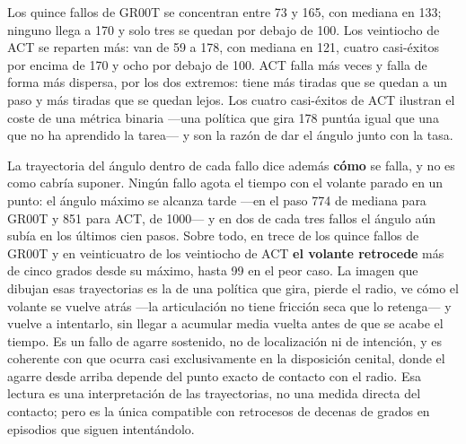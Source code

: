 \begin{table}[ht]
	\centering
	\caption{Caracterización de los episodios fallidos}
	\label{tab:fallos}
\end{table}

Los quince fallos de GR00T se concentran entre 73\textdegree{} y 165\textdegree, con mediana en
133\textdegree; ninguno llega a 170\textdegree{} y solo tres se quedan por debajo de
100\textdegree. Los veintiocho de ACT se reparten más: van de 59\textdegree{} a 178\textdegree,
con mediana en 121\textdegree, cuatro casi-éxitos por encima de 170\textdegree{} y ocho por debajo
de 100\textdegree. ACT falla más veces y falla de forma más dispersa, por los dos extremos: tiene
más tiradas que se quedan a un paso y más tiradas que se quedan lejos. Los cuatro casi-éxitos de
ACT ilustran el coste de una métrica binaria —una política que gira 178\textdegree{} puntúa igual
que una que no ha aprendido la tarea— y son la razón de dar el ángulo junto con la tasa.

La trayectoria del ángulo dentro de cada fallo dice además \textbf{cómo} se falla, y no es como
cabría suponer. Ningún fallo agota el tiempo con el volante parado en un punto: el ángulo máximo se
alcanza tarde —en el paso 774 de mediana para GR00T y 851 para ACT, de 1000— y en dos de cada
tres fallos el ángulo aún subía en los últimos cien pasos. Sobre todo, en trece de los quince
fallos de GR00T y en veinticuatro de los veintiocho de ACT \textbf{el volante retrocede} más de
cinco grados desde su máximo, hasta 99\textdegree{} en el peor caso. La imagen que dibujan esas
trayectorias es la de una política que gira, pierde el radio, ve cómo el volante se vuelve atrás
—la articulación no tiene fricción seca que lo retenga— y vuelve a intentarlo, sin llegar a
acumular media vuelta antes de que se acabe el tiempo. Es un fallo de agarre sostenido, no de
localización ni de intención, y es coherente con que ocurra casi exclusivamente en la disposición
cenital, donde el agarre desde arriba depende del punto exacto de contacto con el radio. Esa
lectura es una interpretación de las trayectorias, no una medida directa del contacto; pero es la
única compatible con retrocesos de decenas de grados en episodios que siguen intentándolo.

